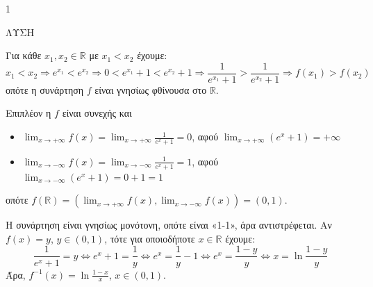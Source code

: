 \begin{ylh}{1}
    \item [Ύλη από εικόνα]
\end{ylh}
ΛΥΣΗ

\begin{alist}
\item [\textalpha)] Για κάθε $x_1, x_2 \in \mathbb{R}$ με $x_1 < x_2$ έχουμε:
\[
x_1 < x_2 \Rightarrow e^{x_1} < e^{x_2} \Rightarrow 0 < e^{x_1} + 1 < e^{x_2} + 1 \Rightarrow \frac{1}{e^{x_1} + 1} > \frac{1}{e^{x_2} + 1} \Rightarrow f(x_1) > f(x_2)
\]
οπότε η συνάρτηση $f$ είναι γνησίως φθίνουσα στο $\mathbb{R}$.

Επιπλέον η $f$ είναι συνεχής και
\begin{itemize}
    \item $\lim_{x \to +\infty} f(x) = \lim_{x \to +\infty} \frac{1}{e^x + 1} = 0$, αφού $\lim_{x \to +\infty} (e^x + 1) = +\infty$
    \item $\lim_{x \to -\infty} f(x) = \lim_{x \to -\infty} \frac{1}{e^x + 1} = 1$, αφού $\lim_{x \to -\infty} (e^x + 1) = 0+1=1$
\end{itemize}
οπότε $f(\mathbb{R}) = \left(\lim_{x \to +\infty} f(x), \lim_{x \to -\infty} f(x)\right) = (0, 1)$.

\item [\textbeta)] Η συνάρτηση είναι γνησίως μονότονη, οπότε είναι «1-1», άρα αντιστρέφεται.
Αν $f(x)=y$, $y \in (0, 1)$, τότε για οποιοδήποτε $x \in \mathbb{R}$ έχουμε:
\[
\frac{1}{e^x + 1} = y \Leftrightarrow e^x + 1 = \frac{1}{y} \Leftrightarrow e^x = \frac{1}{y} - 1 \Leftrightarrow e^x = \frac{1-y}{y} \Leftrightarrow x = \ln \frac{1-y}{y}
\]
Άρα, $f^{-1}(x) = \ln \frac{1-x}{x}$, $x \in (0, 1)$.
\end{alist}